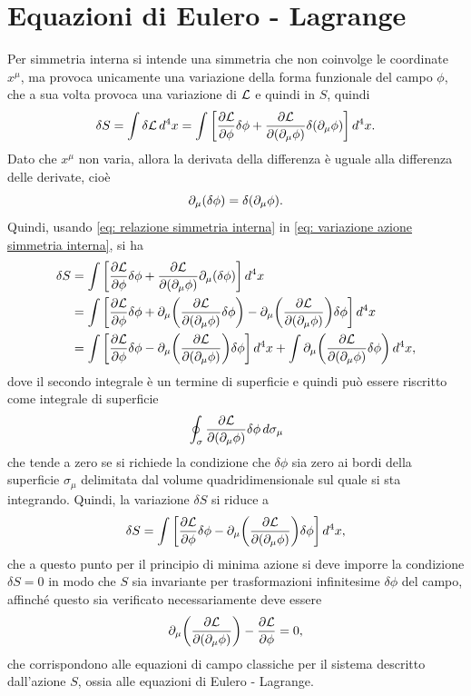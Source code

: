\section{Equazioni di Eulero - Lagrange}
Per simmetria interna si intende una simmetria che non coinvolge le coordinate $x^\mu$, ma provoca unicamente una variazione della forma funzionale del campo $\phi$, che a sua volta provoca una variazione di $\mathcal{L}$ e quindi in $S$, quindi
\begin{equation}
\label{eq: variazione azione simmetria interna}
    \delta S = \int\delta\mathcal{L}\,d^4x = \int\bigg[\frac{\partial\mathcal{L}}{\partial\phi}\delta\phi + \frac{\partial\mathcal{L}}{\partial(\partial_\mu\phi)}\delta(\partial_\mu\phi)\bigg]\,d^4x.
\end{equation}
Dato che $x^\mu$ non varia, allora la derivata della differenza è uguale alla differenza delle derivate, cioè
\begin{equation}
\label{eq: relazione simmetria interna}
    \partial_\mu(\delta\phi) = \delta(\partial_\mu\phi).
\end{equation}
Quindi, usando \eqref{eq: relazione simmetria interna} in \eqref{eq: variazione azione simmetria interna}, si ha
\begin{equation}
    \begin{split}
        \delta S &= \int\bigg[\frac{\partial\mathcal{L}}{\partial\phi}\delta\phi + \frac{\partial\mathcal{L}}{\partial(\partial_\mu\phi)}\partial_\mu(\delta\phi)\bigg]\,d^4x \\
        &= \int\bigg[\frac{\partial\mathcal{L}}{\partial\phi}\delta\phi + \partial_\mu\bigg(\frac{\partial\mathcal{L}}{\partial(\partial_\mu\phi)}\delta\phi\bigg) - \partial_\mu\bigg(\frac{\partial\mathcal{L}}{\partial(\partial_\mu\phi)}\bigg)\delta\phi\bigg]\,d^4x \\
        &= \int\bigg[\frac{\partial\mathcal{L}}{\partial\phi}\delta\phi - \partial_\mu\bigg(\frac{\partial\mathcal{L}}{\partial(\partial_\mu\phi)}\bigg)\delta\phi\bigg]\,d^4x + \int \partial_\mu\bigg(\frac{\partial\mathcal{L}}{\partial(\partial_\mu\phi)}\delta\phi\bigg)\,d^4x,
    \end{split}
\end{equation}
dove il secondo integrale è un termine di superficie e quindi può essere riscritto come integrale di superficie 
\begin{equation}
\label{eq: termine di superficie azione}
    \oint_\sigma\frac{\partial\mathcal{L}}{\partial(\partial_\mu\phi)}\delta\phi\,d\sigma_\mu
\end{equation}
che tende a zero se si richiede la condizione che $\delta\phi$ sia zero ai bordi della superficie $\sigma_\mu$ delimitata dal volume quadridimensionale sul quale si sta integrando. Quindi, la variazione $\delta S$ si riduce a 
\begin{equation}
    \delta S = \int\bigg[\frac{\partial\mathcal{L}}{\partial\phi}\delta\phi - \partial_\mu\bigg(\frac{\partial\mathcal{L}}{\partial(\partial_\mu\phi)}\bigg)\delta\phi\bigg]\,d^4x,
\end{equation}
che a questo punto per il principio di minima azione si deve imporre la condizione $\delta S = 0$ in modo che $S$ sia invariante per trasformazioni infinitesime $\delta\phi$ del campo, affinché questo sia verificato necessariamente deve essere
\begin{equation}
\label{eq: EEL}
    \partial_\mu\bigg(\frac{\partial\mathcal{L}}{\partial(\partial_\mu\phi)}\bigg) - \frac{\partial\mathcal{L}}{\partial\phi} = 0,
\end{equation}
che corrispondono alle equazioni di campo classiche per il sistema descritto dall'azione $S$, ossia alle equazioni di Eulero - Lagrange.

